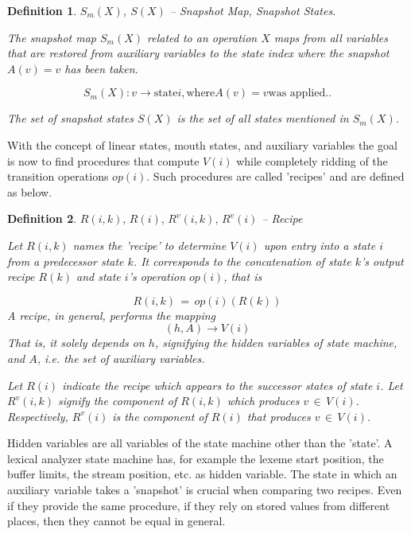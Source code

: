 \documentclass[12pt,a4paper]{scrartcl}
\newtheorem{definition}{Definition}
\begin{document}
\begin{definition} $S_m(X)$, $S(X)$ -- Snapshot Map, Snapshot States.

    The snapshot map $S_m(X)$ related to an operation $X$ maps from all
    variables that are restored from auxiliary variables to the state index
    where the snapshot $A(v)=v$ has been taken.
    
    \begin{equation}
        \label{eq:snapshot-map}
        S_m(X):  v \rightarrow \mbox{state} i, \mbox{where} A(v) = v \mbox{was applied.}.
    \end{equation}

    The set of snapshot states $S(X)$ is the set of all states mentioned in
    $S_m(X)$.

\end{definition}

With the concept of linear states, mouth states, and auxiliary variables the
goal is now to find procedures that compute $V(i)$ while completely ridding
of the transition operations $op(i)$. Such procedures are called 'recipes'
and are defined as below.

\begin{definition}
    $R(i,k),\,R(i),\,R^v(i,k),\,R^v(i)$ -- Recipe 

Let $R(i,k)$ names the 'recipe' to determine $V(i)$ upon entry into a state
$i$ from a predecessor state $k$. It corresponds to the concatenation of
state $k$'s output recipe $R(k)$ and state $i$'s operation $op(i)$, that is

\begin{equation}
    R(i,k) \,=\, op(i)(R(k))
\end{equation}
A recipe, in general, performs the mapping
\begin{equation} \label{eq:recipe-procedure}
    (h, A) \rightarrow V(i)                                             
\end{equation}
That is, it solely depends on $h$, signifying the hidden variables of state machine,
and $A$, i.e. the set of auxiliary variables.  

Let $R(i)$ indicate the recipe which appears to the successor states of
state $i$.  Let $R^v(i,k)$ signify the component of $R(i,k)$ which produces
$v\,\in\,V(i)$.  Respectively, $R^v(i)$ is the component of $R(i)$ that
produces $v\,\in\,V(i)$.

\end{definition}

Hidden variables are all variables of the state machine other than the 'state'.
A lexical analyzer state machine has, for example the lexeme start position,
the buffer limits, the stream position, etc. as hidden variable. The state
in which an auxiliary variable takes a 'snapshot' is crucial when comparing
two recipes. Even if they provide the same procedure, if they rely on stored
values from different places, then they cannot be equal in general.
\end{document}
